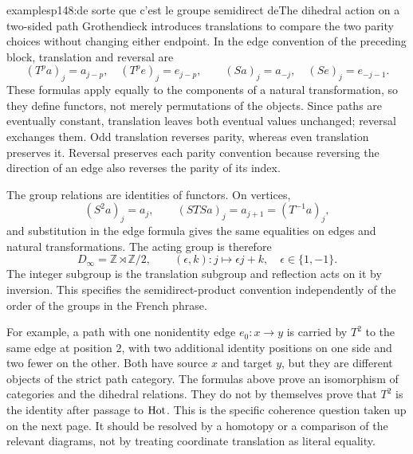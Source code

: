 \begin{dcomment}{examples}{p148:de sorte que c'est le groupe semidirect de}{The dihedral action on a two-sided path}
Grothendieck introduces translations to compare the two parity choices without changing either endpoint. In the edge convention of the preceding block, translation and reversal are
\[
 (T^pa)_j=a_{j-p},\quad (T^pe)_j=e_{j-p},
 \qquad
 (Sa)_j=a_{-j},\quad (Se)_j=e_{-j-1}.
\]
These formulas apply equally to the components of a natural transformation, so they define functors, not merely permutations of the objects. Since paths are eventually constant, translation leaves both eventual values unchanged; reversal exchanges them. Odd translation reverses parity, whereas even translation preserves it. Reversal preserves each parity convention because reversing the direction of an edge also reverses the parity of its index.

The group relations are identities of functors. On vertices,
\[
 (S^2a)_j=a_j,
 \qquad
 (STSa)_j=a_{j+1}=(T^{-1}a)_j,
\]
and substitution in the edge formula gives the same equalities on edges and natural transformations. The acting group is therefore
\[
 D_\infty=\mathbb Z\rtimes\mathbb Z/2,
 \qquad (\epsilon,k):j\longmapsto\epsilon j+k,
 \quad \epsilon\in\{1,-1\}.
\]
The integer subgroup is the translation subgroup and reflection acts on it by inversion. This specifies the semidirect-product convention independently of the order of the groups in the French phrase.

For example, a path with one nonidentity edge $e_0:x\to y$ is carried by $T^2$ to the same edge at position $2$, with two additional identity positions on one side and two fewer on the other. Both have source $x$ and target $y$, but they are different objects of the strict path category. The formulas above prove an isomorphism of categories and the dihedral relations. They do not by themselves prove that $T^2$ is the identity after passage to $\mathrm{Hot}$. This is the specific coherence question taken up on the next page. It should be resolved by a homotopy or a comparison of the relevant diagrams, not by treating coordinate translation as literal equality.
\end{dcomment}


